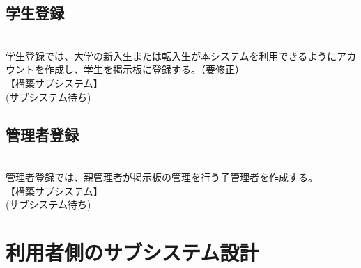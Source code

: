 \documentclass[a4j]{jarticle}
\begin{document}
\subsection{学生登録}
\\学生登録では、大学の新入生または転入生が本システムを利用できるようにアカウントを作成し、学生を掲示板に登録する。（要修正）
\\【構築サブシステム】
\\ (サブシステム待ち)

\subsection{管理者登録}
\\管理者登録では、親管理者が掲示板の管理を行う子管理者を作成する。
\\【構築サブシステム】
\\ (サブシステム待ち)

\section{利用者側のサブシステム設計}
\end{document}
